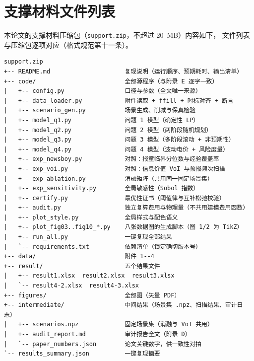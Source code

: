 
\section{支撑材料文件列表}

本论文的支撑材料压缩包（\texttt{support.zip}，不超过 20~MB）内容如下，
文件列表与压缩包逐项对应（格式规范第十一条）。

\begin{lstlisting}[style=plain,basicstyle=\ttfamily\footnotesize\songti]
support.zip
+-- README.md                     复现说明（运行顺序、预期耗时、输出清单）
+-- code/                         全部源程序（与附录 E 逐字一致）
|   +-- config.py                 口径与参数（全文唯一来源）
|   +-- data_loader.py            附件读取 + ffill + 时标对齐 + 断言
|   +-- scenario_gen.py           场景生成、削减与保真检验
|   +-- model_q1.py               问题 1 模型（确定性 LP）
|   +-- model_q2.py               问题 2 模型（两阶段随机规划）
|   +-- model_q3.py               问题 3 模型（多阶段滚动 + 非预期性）
|   +-- model_q4.py               问题 4 模型（波动电价 + 风险度量）
|   +-- exp_newsboy.py            对照：报童临界分位数与经验覆盖率
|   +-- exp_voi.py                对照：信息价值 VoI 与预报频次扫描
|   +-- exp_ablation.py           消融矩阵（共用同一固定场景集）
|   +-- exp_sensitivity.py        全局敏感性（Sobol 指数）
|   +-- certify.py                最优性证书（阈值律与互补松弛校验）
|   +-- audit.py                  独立复算费用与物理量（不共用建模费用函数）
|   +-- plot_style.py             全局样式与配色语义
|   +-- plot_fig03..fig10_*.py    八张数据图的生成脚本（图 1/2 为 TikZ）
|   +-- run_all.py                一键复现全部结果
|   `-- requirements.txt          依赖清单（锁定确切版本号）
+-- data/                         附件 1--4
+-- result/                       五个结果文件
|   +-- result1.xlsx  result2.xlsx  result3.xlsx
|   `-- result4-2.xlsx  result4-3.xlsx
+-- figures/                      全部图（矢量 PDF）
+-- intermediate/                 中间结果（场景集 .npz、扫描结果、审计日志）
|   +-- scenarios.npz             固定场景集（消融与 VoI 共用）
|   +-- audit_report.md           审计报告全文（附录 D）
|   `-- paper_numbers.json        论文关键数字，供一致性对拍
`-- results_summary.json          一键复现摘要
\end{lstlisting}

